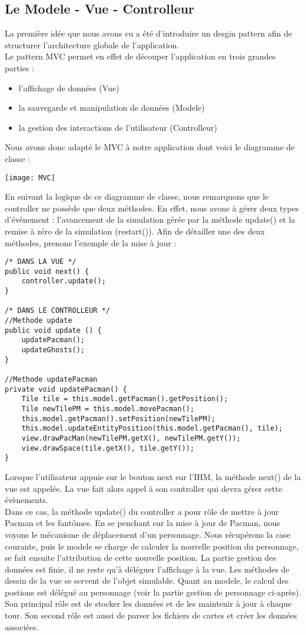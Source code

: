 \subsection{Le Modele - Vue - Controlleur}

La première idée que nous avons eu a été d'introduire un desgin pattern afin de structurer l'architecture globale de l'application. \\ Le pattern MVC permet en effet de découper l'application en trois grandes parties :
\begin{itemize}
 	\item l'affichage de données (Vue)
 	\item la sauvegarde et manipulation de données (Modele)
 	\item la gestion des interactions de l'utilisateur (Controlleur)
 \end{itemize}
Nous avons donc adapté le MVC à notre application dont voici le diagramme de classe : \\[0.5cm]
\centerline{\texttt{[image: MVC]}}

En suivant la logique de ce diagramme de classe, nous remarquons que le controller ne possède que deux méthodes. En effet, nous avons à gérer deux types d'évènement : l'avancement de la simulation gérée par la méthode update() et la remise à zéro de la simulation (restart()).
Afin de détailler une des deux méthodes, prenons l'exemple de la mise à jour :

\begin{lstlisting}
/* DANS LA VUE */
public void next() {
	controller.update();
}

/* DANS LE CONTROLLEUR */
//Methode update
public void update () {
	updatePacman();
	updateGhosts();
}

//Methode updatePacman
private void updatePacman() {
	Tile tile = this.model.getPacman().getPosition();
	Tile newTilePM = this.model.movePacman();
	this.model.getPacman().setPosition(newTilePM);
	this.model.updateEntityPosition(this.model.getPacman(), tile);
	view.drawPacMan(newTilePM.getX(), newTilePM.getY());
	view.drawSpace(tile.getX(), tile.getY());
}
\end{lstlisting}
Lorsque l'utilisateur appuie sur le bouton next sur l'IHM, la méthode next() de la vue est appelée. La vue fait alors appel à son controller qui devra gérer cette évènements. \\
Dans ce cas, la méthode update() du controller a pour rôle de mettre à jour Pacman et les fantômes. En se penchant sur la mise à jour de Pacman, nous voyons le mécanisme de déplacement d'un personnage. Nous récupérons la case courante, puis le modele se charge de calculer la nouvelle position du personnage, se fait ensuite l'attribution de cette nouvelle position. La partie gestion des données est finie, il ne reste qu'à déléguer l'affichage à la vue. Les méthodes de dessin de la vue se servent de l'objet simulable. Quant au modele, le calcul des postions est délégué au personnage (voir la partie gestion de personnage ci-après). Son principal rôle est de stocker les données et de les maintenir à jour à chaque tour. Son second rôle est aussi de parser les fichiers de cartes et créer les données associées.




